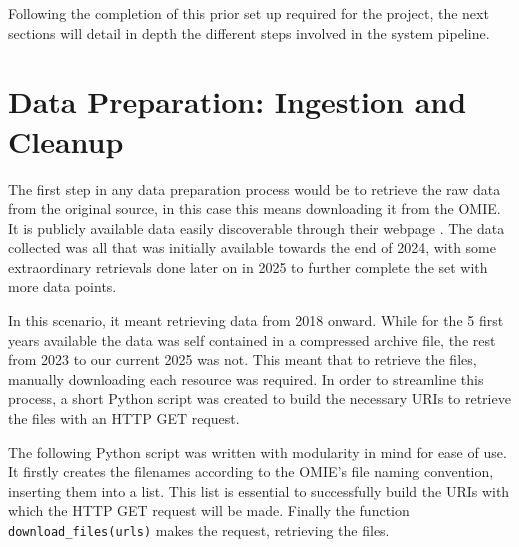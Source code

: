\documentclass[12pt]{report} %
\begin{document}
Following the completion of this prior set up required for the project, the next sections will detail in depth the different steps involved in the system pipeline.



\section{Data Preparation: Ingestion and Cleanup}


The first step in any data preparation process would be to retrieve the raw data from the original source, in this case this means downloading it from the OMIE. It is publicly available data easily discoverable through their webpage \cite{omie_datos}. The data collected was all that was initially available towards the end of 2024, with some extraordinary retrievals done later on in 2025 to further complete the set with more data points.

In this scenario, it meant retrieving data from 2018 onward. While for the 5 first years available the data was self contained in a compressed archive file, the rest from 2023 to our current 2025 was not. This meant that to retrieve the files, manually downloading each resource was required. In order to streamline this process, a short Python script was created to build the necessary URIs to retrieve the files with an HTTP GET request.

The following Python script was written with modularity in mind for ease of use. It firstly creates the filenames according to the OMIE's file naming convention, inserting them into a list. This list is essential to successfully build the URIs with which the HTTP GET request will be made. Finally the function \small{\verb|download_files(urls)|} makes the request, retrieving the files.
\end{document}
